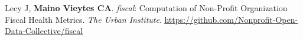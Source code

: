 




\begin{cvskills}

  \cvskill
    {} %
    {Lecy J, \textbf{Maino Vieytes CA}. \textit{fiscal}: Computation of Non-Profit Organization Fiscal Health Metrics. \textit{The Urban Institute}. \textcolor{navyblue}{\underline{\href{https://github.com/Nonprofit-Open-Data-Collective/fiscal }{https://github.com/Nonprofit-Open-Data-Collective/fiscal}}}}


  \end{cvskills}